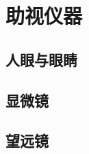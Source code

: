 

\section{助视仪器}\label{24-3}

\subsection{人眼与眼睛}\label{24-3-1}

\subsection{显微镜}\label{24-3-2}

\subsection{望远镜}\label{24-3-3}